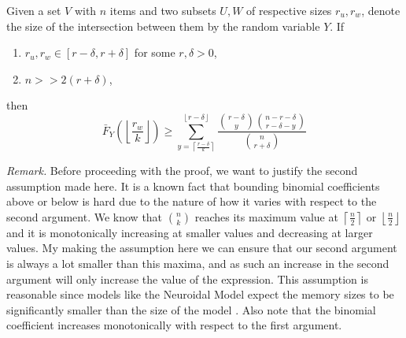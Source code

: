 \begin{lemma}
    \label{lemma:expected-k-int-prob}
    Given a set $V$ with $n$ items and two subsets $U,W$ of respective sizes $r_u,r_w$, denote the size of the intersection between them by the random variable $Y$.
        If \begin{enumerate}
            \item $r_u, r_w \in [r-\delta, r+\delta]$ for some $r, \delta > 0$,
            \item $n >> 2(r+\delta)$, 
        \end{enumerate}      
then $$ \bar{F}_Y\left(\left\lfloor \frac{r_w}{k} 
\right\rfloor\right) \ge \sum_{y = \left\lceil \frac{r-\delta}{k} \right\rceil}^{\left\lfloor r - \delta \right\rfloor} \frac{\binom{r-\delta}{y} \binom{n-r-\delta}{r-\delta-y}}{\binom{n}{r+\delta}}$$
    \end{lemma}
    \textit{Remark.} Before proceeding with the proof, we want to justify the second assumption made here. It is a known fact that bounding binomial coefficients above or below is hard due to the nature of how it varies with respect to the second argument. We know that $n \choose k$ reaches its maximum value at $\left\lceil \frac{n}{2} \right\rceil$ or $\left\lfloor \frac{n}{2} \right\rfloor$ and it is monotonically increasing at smaller values and decreasing at larger values. My making the assumption here we can ensure that our second argument is always a lot smaller than this maxima, and as such an increase in the second argument will only increase the value of the expression. This assumption is reasonable since models like the Neuroidal Model expect the memory sizes to be significantly smaller than the size of the model \cite{valiant2005memorization}. Also note that the binomial coefficient increases monotonically with respect to the first argument. 
